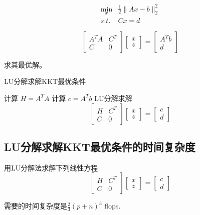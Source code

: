 \begin{problem}
    \begin{equation}\begin{aligned}
        \min _{x} & \frac{1}{2}\|A x-b\|_{2}^{2}\\
        s.t. & C x=d
    \end{aligned}\end{equation}

    \begin{equation}
\left[\begin{array}{cc}
A^{T} A & C^{T} \\
C & 0
\end{array}\right]\left[\begin{array}{l}
x \\
z
\end{array}\right]=\left[\begin{array}{c}
A^{T} b \\
d
\end{array}\right]
\end{equation}

求其最优解。
\end{problem}



\begin{algorithm}[htbp]
    \caption{LU分解求解KKT最优条件}
    计算 $ H=A^{T} A $\;
    计算 $ c=A^{T} b $ \;
    LU分解求解\begin{equation}
    \left[\begin{array}{cc}
    H & C^{T} \\
    C & 0
    \end{array}\right]\left[\begin{array}{l}
    x \\
    z
    \end{array}\right]=\left[\begin{array}{l}
    c \\
    d
    \end{array}\right]
    \end{equation}\;
\end{algorithm}

\subsection{LU分解求解KKT最优条件的时间复杂度}

\begin{theorem}
    用LU分解法求解下列线性方程 
\begin{equation}
\left[\begin{array}{cc}
H & C^{T} \\
C & 0
\end{array}\right]\left[\begin{array}{l}
x \\
z
\end{array}\right]=\left[\begin{array}{l}
c \\
d
\end{array}\right]
\end{equation}

需要的时间复杂度是$ \frac{2}{3}(p+n)^{3} $ flops.
\end{theorem}

